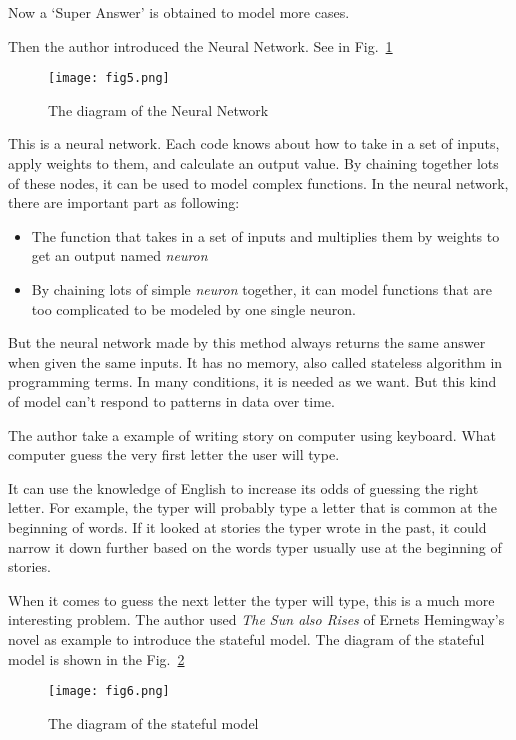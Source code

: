 \documentclass[a4paper,12pt,twocolumn]{article}
\begin{document}
\par
Now a `Super Answer' is obtained to model more cases.
\par
Then the author introduced the Neural Network. See in Fig.~\ref{fig5}
\begin{figure}[h]
	\centering
	\texttt{[image: fig5.png]}
	\caption{The diagram of the Neural Network}\label{fig5}
\end{figure}
\par
This is a neural network. Each code knows about how to take in a set of inputs, apply weights to them, and calculate an output value. By chaining together lots of these nodes, it can be used to model complex functions. In the neural network, there are important part as following:
\begin{itemize}
	\item The function that takes in a set of inputs and multiplies them by weights to get an output named \emph{neuron}
	\item By chaining lots of simple \emph{neuron} together, it can model functions that are too complicated to be modeled by one single neuron.
\end{itemize}
\par
But the neural network made by this method always returns the same answer when given the same inputs. It has no memory, also called stateless algorithm in programming terms. In many conditions, it is needed as we want. But this kind of model can't respond to patterns in data over time.
\par
The author take a example of writing story on computer using keyboard. What computer guess the very first letter the user will type.
\par
It can use the knowledge of English to increase its odds of guessing the right letter. For example, the typer will probably type a letter that is common at the beginning of words. If it looked at stories the typer wrote in the past, it could narrow it down further based on the words typer usually use at the beginning of stories.
\par
When it comes to guess the next letter the typer will type, this is a much more interesting problem. The author used \emph{The Sun also Rises} of Ernets Hemingway's novel as example to introduce the stateful model. The diagram of the stateful model is shown in the Fig.~\ref{fig6}
\begin{figure}[h]
	\centering
	\texttt{[image: fig6.png]}
	\caption{The diagram of the stateful model}\label{fig6}
\end{figure}
\end{document}
